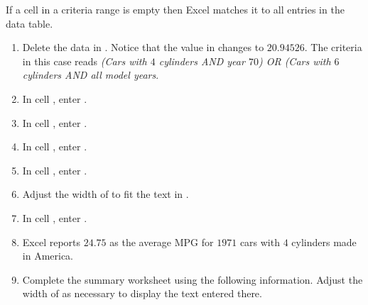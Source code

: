 If a cell in a criteria range is empty then Excel matches it to all entries in the data table.

\begin{enumerate}[resume]

	\item Delete the data in . Notice that the value in  changes to $ 20.94526 $. The criteria in this case reads \textit{(Cars with $ 4 $ cylinders AND year $ 70 $) OR (Cars with $ 6 $ cylinders AND all model years}. 
	\item In cell , enter .
	\item In cell , enter .
	\item In cell , enter .
	\item In cell , enter .
	\item Adjust the width of  to fit the text in .
	\item In cell , enter .
	\item Excel reports $ 24.75 $ as the average MPG for $ 1971 $ cars with $ 4 $ cylinders made in America. 
	
	\item Complete the summary worksheet using the following information. Adjust the width of  as necessary to display the text entered there.
	
\end{enumerate}	

